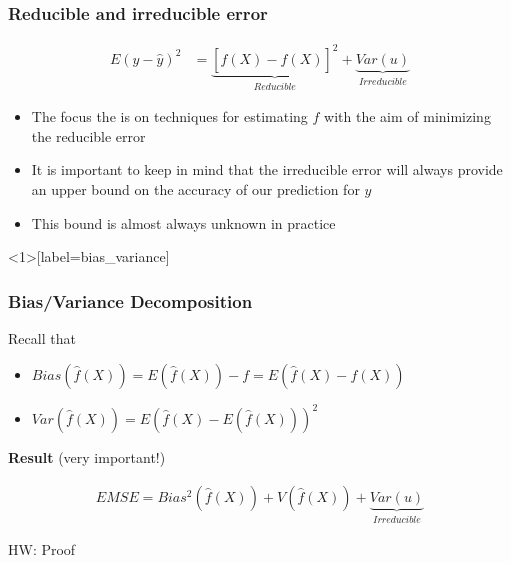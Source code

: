 \documentclass[
  shownotes,
  xcolor={svgnames},
  hyperref={colorlinks,citecolor=DarkBlue,linkcolor=andesred,urlcolor=DarkBlue}
  , aspectratio=169]{beamer}
\begin{document}
\begin{frame}
\frametitle{Reducible and irreducible error}

\begin{align}
E(y-\hat y)^2  &= \underset{Reducible}{\underbrace{[f(X)-\hat{f}(X)]^{2}}}+\underset{Irreducible}{\underbrace{Var(u)}}
\end{align}
\bigskip
\begin{itemize}
\item The focus the is on techniques for estimating $f$ with the aim of minimizing the reducible error
\medskip
\item It is important to keep in mind that the irreducible error will always provide an upper bound on the accuracy of our prediction for $y$
\medskip
\item This bound is almost always unknown in practice
\end{itemize}


\end{frame}

\begin{frame}<1>[label=bias_variance]
\frametitle{Bias/Variance Decomposition}

Recall that 
\begin{itemize}
  \item $Bias (\hat f(X) )=E (\hat f(X) )-f=E (\hat f(X)-f(X))$
  \item  $Var (\hat f(X))  =E (\hat f(X) - E (\hat f(X)))^2$
\end{itemize}
\pause
\bigskip
{\bf Result} (very important!)
\bigskip

\begin{align}
  EMSE = Bias^2 (\hat f(X))+V (\hat f(X)) +\underset{Irreducible}{\underbrace{Var(u)}}
\end{align}

{\tiny HW: Proof}

\end{frame}
\end{document}
